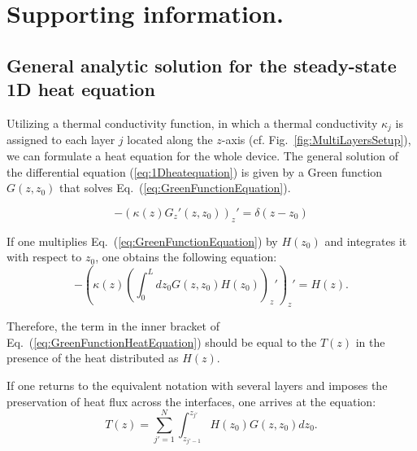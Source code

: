 \documentclass[%
9pt,
 aip,
rsi,%
 amsmath,amssymb,
preprint,%
]{revtex4-1}
\begin{document}
\clearpage

\clearpage

\section*{Supporting information.}

\subsection*{General analytic solution for the steady-state 1D heat equation}


Utilizing a thermal conductivity function, in which a thermal conductivity $\kappa_j$ is assigned to each layer $j$ located along the $z$-axis (cf. Fig.~\ref{fig:MultiLayersSetup}), we can formulate a heat equation for the whole device.
The general solution of the differential equation (\ref{eq:1Dheatequation}) is given by a Green function $G(z,z_0)$ that solves Eq.~(\ref{eq:GreenFunctionEquation}). 

\begin{equation}
	-\left( \kappa(z) G_z'(z,z_0)  \right)_z' = \delta(z-z_0)
    \label{eq:GreenFunctionEquation}
\end{equation}

If one multiplies Eq.~(\ref{eq:GreenFunctionEquation}) by $H(z_0)$ and integrates it with respect to $z_0$, one obtains the following equation: %
\begin{equation}
	-{\left(\kappa (z) \left(\int_0^L dz_0 G(z,z_0) H(z_0) \right)_z' \right)}_z' = H(z).
	\label{eq:GreenFunctionHeatEquation}
\end{equation}

Therefore, the term in the inner bracket of Eq.~(\ref{eq:GreenFunctionHeatEquation}) should be equal to the $T(z)$ in the presence of the heat distributed as $H(z)$. 

If one returns to the equivalent notation with several layers and imposes the preservation of heat flux across the interfaces, one arrives at the equation: %
\begin{equation}
	T(z) = \sum_{j'=1}^{N} \int_{z_{j'-1}}^{z_{j'}} H(z_0) G(z,z_0) dz_0.
    \label{eq:GreenFunctionSolution}
\end{equation}
\end{document}
